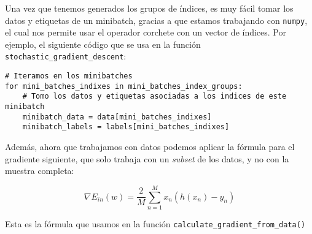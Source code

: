\documentclass[11pt]{article}
\begin{document}
Una vez que tenemos generados los grupos de índices, es muy fácil tomar los datos y etiquetas de un minibatch, gracias a que estamos trabajando con \lstinline{numpy}, el cual nos permite usar el operador corchete con un vector de índices. Por ejemplo, el siguiente código que se usa en la función \lstinline{stochastic_gradient_descent}:


\begin{lstlisting}
# Iteramos en los minibatches
for mini_batches_indixes in mini_batches_index_groups:
    # Tomo los datos y etiquetas asociadas a los indices de este minibatch
    minibatch_data = data[mini_batches_indixes]
    minibatch_labels = labels[mini_batches_indixes]
\end{lstlisting}

Además, ahora que trabajamos con datos podemos aplicar la fórmula para el gradiente siguiente, que solo trabaja con un \emph{subset} de los datos, y no con la muestra completa:

\begin{displaymath}
    \nabla E_{in}(w) = \frac{2}{M} \sum^M_{n=1} x_n (h(x_n) - y_n)
\end{displaymath}

Esta es la fórmula que usamos en la función \lstinline{calculate_gradient_from_data()}
\end{document}
